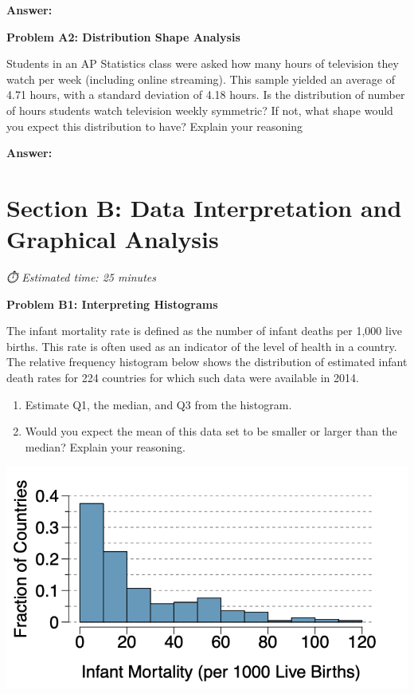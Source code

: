 \documentclass[
  11pt,
]{article}
\providecommand{\tightlist}{%
  \setlength{\itemsep}{0pt}\setlength{\parskip}{0pt}}\usepackage{longtable,booktabs,array}
\begin{document}
\textbf{Answer:}

\textbf{Problem A2: Distribution Shape Analysis}

Students in an AP Statistics class were asked how many hours of
television they watch per week (including online streaming). This sample
yielded an average of 4.71 hours, with a standard deviation of 4.18
hours. Is the distribution of number of hours students watch television
weekly symmetric? If not, what shape would you expect this distribution
to have? Explain your reasoning

\textbf{Answer:}

\section{Section B: Data Interpretation and Graphical
Analysis}\label{section-b-data-interpretation-and-graphical-analysis}

\emph{⏱️ Estimated time: 25 minutes}

\textbf{Problem B1: Interpreting Histograms}

The infant mortality rate is defined as the number of infant deaths per
1,000 live births. This rate is often used as an indicator of the level
of health in a country. The relative frequency histogram below shows the
distribution of estimated infant death rates for 224 countries for which
such data were available in 2014.

\begin{enumerate}
\def\labelenumi{(\alph{enumi})}
\tightlist
\item
  Estimate Q1, the median, and Q3 from the histogram.
\item
  Would you expect the mean of this data set to be smaller or larger
  than the median? Explain your reasoning.
\end{enumerate}

\includegraphics[width=1\linewidth,height=\textheight,keepaspectratio]{../../files/worksheets/img/infant_mortality.png}
\end{document}
